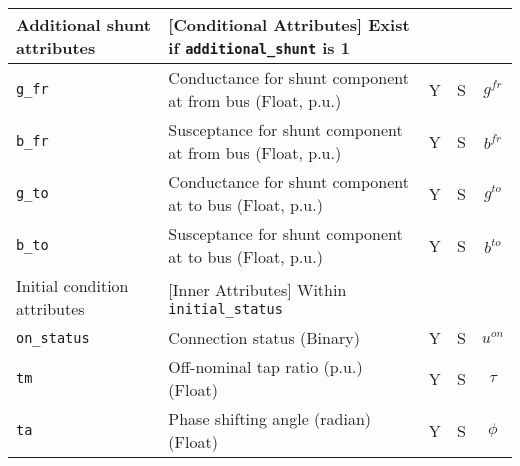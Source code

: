 \documentclass{article}
\begin{document}
\begin{center}
\small
\begin{tabular}{ l | l | c | c | c |}
  Additional shunt attributes & [Conditional Attributes] Exist if {\tt additional\_shunt} is 1 &  & & \\
  \hline
  {\tt g\_fr} & Conductance for shunt component at from bus (Float, p.u.)& Y & S & $g^{fr}$\\
  {\tt b\_fr} & Susceptance for shunt component at from bus (Float, p.u.)& Y & S & $b^{fr}$\\
  {\tt g\_to} & Conductance for shunt component at to bus (Float, p.u.)& Y & S & $g^{to}$\\
  {\tt b\_to} & Susceptance for shunt component at to bus (Float, p.u.)& Y & S & $b^{to}$\\
  \hline
  Initial condition attributes & [Inner Attributes] Within {\tt initial\_status} & & & \\
  \hline
  {\tt on\_status} & Connection status (Binary) & Y & S & $u^{on}$ \\
  {\tt tm} & Off-nominal tap ratio (p.u.) (Float)& Y & S & $\tau$\\
  {\tt ta} & Phase shifting angle (radian) (Float)& Y & S & $\phi$\\
  \hline
\end{tabular}
\end{center}


\end{document}
